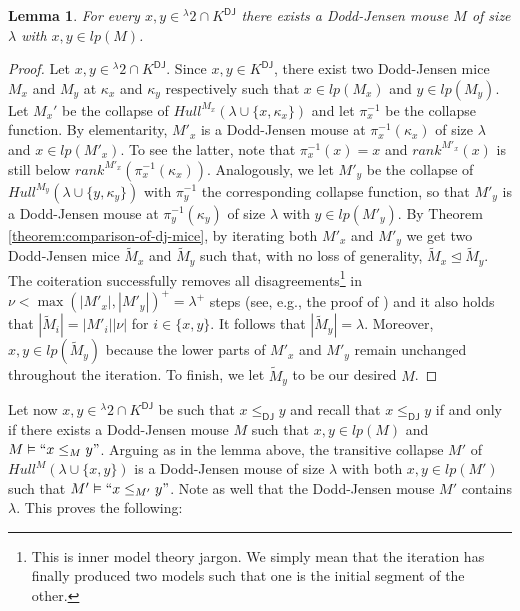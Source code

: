 \documentclass{amsart}
\numberwithin{equation}{section}
\newtheorem{lemma}[theorem]{Lemma}
\theoremstyle{definition}
\theoremstyle{remark}
\begin{document}
\begin{lemma}\label{32}
	For every $x,y\in{}^{\lambda}2\cap K^{\mathsf{DJ}}$ there exists a Dodd-Jensen mouse $M$ of size $\lambda$ with $x,y\in lp(M)$.
\end{lemma}
\begin{proof}
	Let $x,y\in{}^{\lambda}2\cap K^{\mathsf{DJ}}$. Since $x,y\in K^{\mathsf{DJ}}$, there exist two Dodd-Jensen mice $M_{x}$ and $M_{y}$ at $\kappa_x$ and $\kappa_y$ respectively such that $x\in lp(M_{x})$ and $y\in lp(M_{y})$. Let $M_{x}'$ be the collapse of $Hull^{M_{x}}(\lambda\cup\{x,\kappa_x\})$ and let $\pi_{x}^{-1}$ be the collapse function. By elementarity, $M'_x$ is a Dodd-Jensen mouse at $\pi_{x}^{-1}(\kappa_x)$ of size $\lambda$ and $x\in lp(M'_x)$. To see the latter, note that $\pi^{-1}_x(x)=x$ and $rank^{M'_x}(x)$ is still below $rank^{M'_x}(\pi_{x}^{-1}(\kappa_x))$. Analogously, we let $M'_{y}$ be the collapse of $Hull^{M_{y}}(\lambda\cup\{y,\kappa_y\})$ with $\pi_{y}^{-1}$ the corresponding collapse function, so that $M'_y$ is a Dodd-Jensen mouse at $\pi_{y}^{-1}(\kappa_y)$ of size $\lambda$ with $y\in lp(M'_y)$.  By Theorem \ref{theorem:comparison-of-dj-mice}, by iterating both $M'_{x}$ and $M'_{y}$ we get two Dodd-Jensen mice $\tilde{M}_{x}$ and $\tilde{M}_{y}$ such that, with no loss of generality, $\tilde{M}_{x}\trianglelefteq\tilde{M}_{y}$. The coiteration successfully removes all disagreements\footnote{This is inner model theory jargon. We simply mean that the iteration has finally produced two models such that one is the initial segment of the other.} in $\nu<\max(|M'_x|,|M'_y|)^{+}=\lambda^{+}$ steps (see, e.g., the proof of \cite[Lemma 4.8]{steel2016introduction}) and it also holds that $|\tilde{M}_i|=|M'_i||\nu|$ for $i\in\{x,y\}$. It follows that $|\tilde{M}_{y}|=\lambda$. Moreover, $x,y\in lp(\tilde{M}_{y})$ because the lower parts of $M'_x$ and $M'_y$ remain unchanged throughout the iteration. To finish, we let $\tilde{M}_y$ to be our desired $M$. 
\end{proof}

Let now $x,y\in{}^{\lambda}2\cap K^{\mathsf{DJ}}$ be such that $x\leq_{\mathsf{DJ}}y$ and recall that $x\leq_{\mathsf{DJ}}y$ if and only if there exists a Dodd-Jensen mouse $M$ such that $x,y\in lp(M)$ and $M\vDash ``x\leq_{M}y"$. Arguing as in the lemma above, the transitive collapse $M'$ of $Hull^{M}(\lambda\cup\{x,y\})$ is a Dodd-Jensen mouse of size $\lambda$ with both $x,y\in lp(M')$ such that $M'\vDash``x\leq_{M'}y"$. Note as well that the Dodd-Jensen mouse $M'$ contains $\lambda$. This proves the following:
\end{document}
